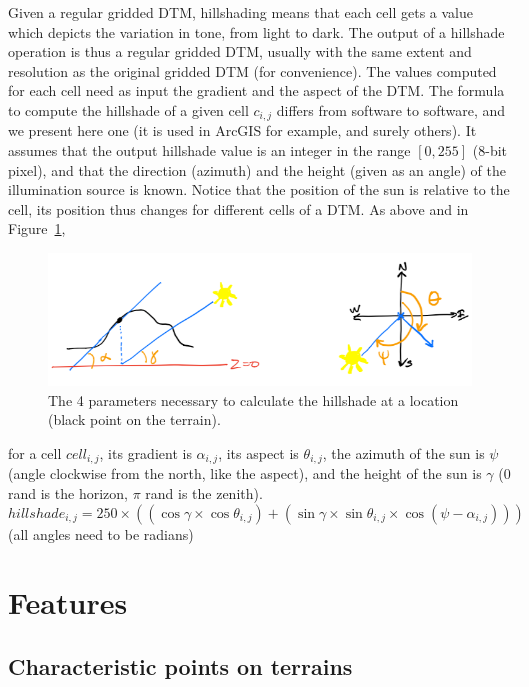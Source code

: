 Given a regular gridded DTM, hillshading means that each cell gets a value which depicts the variation in tone, from light to dark.
The output of a hillshade operation is thus a regular gridded DTM, usually with the same extent and resolution as the original gridded DTM (for convenience).
The values computed for each cell need as input the gradient and the aspect of the DTM\@.
The formula to compute the hillshade of a given cell $c_{i,j}$ differs from software to software, and we present here one (it is used in ArcGIS for example, and surely others).
It assumes that the output hillshade value is an integer in the range $[0,255]$ (8-bit pixel), and that the direction (azimuth) and the height (given as an angle) of the illumination source is known.
Notice that the position of the sun is relative to the cell, its position thus changes for different cells of a DTM\@.
As above and in Figure~\ref{fig:hillshade-params}, 
\begin{figure}
  \centering
  \includegraphics[width=0.95\linewidth]{figs/hillshade-params}
  \caption{The 4 parameters necessary to calculate the hillshade at a location (black point on the terrain).}%
\label{fig:hillshade-params}
\end{figure}
for a cell $cell_{i,j}$, its gradient is $\alpha_{i,j}$, its aspect is $\theta_{i,j}$, the azimuth of the sun is $\psi$ (angle clockwise from the north, like the aspect), and the height of the sun is $\gamma$ (0 rand is the horizon, $\pi$ rand is the zenith).
\begin{equation}  
  hillshade_{i,j} = 250 \times ((\cos\gamma \times \cos\theta_{i,j}) + (\sin\gamma \times \sin\theta_{i,j} \times \cos (\psi - \alpha_{i,j}))) 
\end{equation}
(all angles need to be radians)



%
\section{Features}


\subsection{Characteristic points on terrains}

